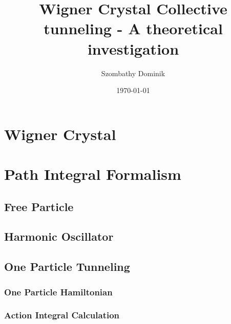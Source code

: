 




\usepackage{blindtext}



\title{Wigner Crystal Collective tunneling - A theoretical investigation}
\author{Szombathy Dominik}
	
	
\date{\today}



\begin{abstract}
	
\end{abstract}

\maketitle

\tableofcontents


\section{Wigner Crystal}\blindtext
\section{Path Integral Formalism} \blindtext
	\subsection{Free Particle}\blindtext
	\subsection{Harmonic Oscillator}\blindtext
	\subsection{One Particle Tunneling}\blindtext
		\subsubsection{One Particle Hamiltonian}\blindtext
		\subsubsection{Action Integral Calculation}\blindtext
